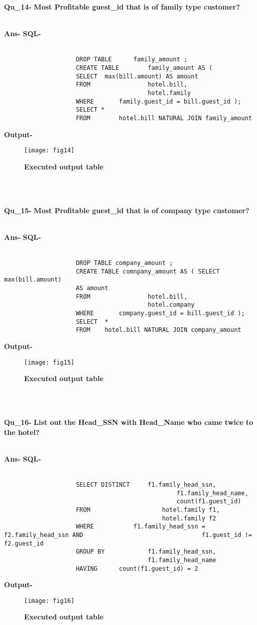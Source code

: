\documentclass[a4,12pt]{report}
\begin{document}
\textbf{Qu\_14-}  \textbf{Most Profitable guest\_id that is of family type customer?} \\\

\textbf{Ans-}		\textbf{SQL-} \\\
\begin{lstlisting}
					DROP TABLE 		family_amount ;
					CREATE TABLE 		family_amount AS (
					SELECT  max(bill.amount) AS amount
					FROM				hotel.bill,
										hotel.family
					WHERE		family.guest_id = bill.guest_id );
					SELECT *
					FROM		hotel.bill NATURAL JOIN	family_amount
\end{lstlisting}	
\textbf{Output-} \\			   
\begin{figure}[hbtp]
\centering
\texttt{[image: fig14]}
\caption{\textbf{{\color{red}Executed output table}}}
\end{figure}
\\\

\textbf{Qu\_15-}  \textbf{Most Profitable guest\_id that is of company type customer?} \\\

\textbf{Ans-}		\textbf{SQL-} \\\
\begin{lstlisting}
					DROP TABLE company_amount ;
					CREATE TABLE comnpany_amount AS ( SELECT  max(bill.amount)
					AS amount
					FROM				hotel.bill, 
										hotel.company
					WHERE		company.guest_id = bill.guest_id );
					SELECT  *
					FROM	hotel.bill NATURAL JOIN	company_amount
\end{lstlisting}			
\textbf{Output-} \\			   
\begin{figure}[hbtp]
\centering
\texttt{[image: fig15]}
\caption{\textbf{{\color{red}Executed output table}}}
\end{figure}
\\\

\textbf{Qu\_16-}  \textbf{List out the Head\_SSN with Head\_Name who came twice to the hotel?} \\\

\textbf{Ans-}		\textbf{SQL-} \\\
\begin{lstlisting}
					SELECT DISTINCT		f1.family_head_ssn, 
												f1.family_head_name,  
												count(f1.guest_id) 
					FROM					hotel.family f1, 
											hotel.family f2  
					WHERE			f1.family_head_ssn = f2.family_head_ssn AND 								f1.guest_id != f2.guest_id 
					GROUP BY			f1.family_head_ssn,
										f1.family_head_name 
					HAVING		count(f1.guest_id) = 2
\end{lstlisting}
\textbf{Output-} \\			   
\begin{figure}[hbtp]
\centering
\texttt{[image: fig16]}
\caption{\textbf{{\color{red}Executed output table}}}
\end{figure}
\\\
\end{document}
